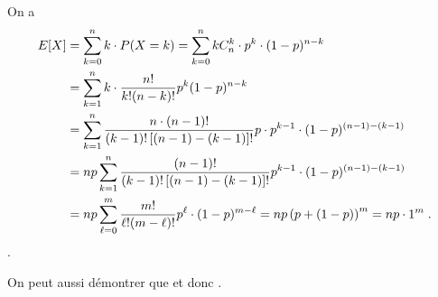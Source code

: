                   On a 
                  \begin{align*}
                        E[X] & = \sum_{k=0}^{n} k \cdot P(X=k)                                                
                               = \sum_{k=0}^{n} k C_{n}^{k} \cdot p^k \cdot (1-p)^{n-k}                        \\
                             & = \sum_{k=1}^{n} k \cdot \frac{n!}{k! (n-k)!} p^k (1-p)^{n-k}                  \\
                             & = \sum_{k=1}^{n} \frac{n \cdot (n-1)!}{(k-1)! \left[ (n-1) - (k-1) \right]!} 
                                       p \cdot p^{k-1} \cdot (1-p)^{(n-1) - (k-1)}                            \\
                             & = n p \sum_{k=1}^{n} \frac{(n-1)!}{(k-1)! \left[ (n-1) - (k-1) \right]!}
                                               p^{k-1} \cdot (1-p)^{(n-1) - (k-1)}                            \\
                             & = n p \sum_{\ell=0}^{m} \frac{m!}{\ell! (m-\ell)!} p^{\ell} \cdot (1-p)^{m-\ell}               
                               = n p \left(p+(1-p)\right)^{m}                                                 
                               = n p \cdot 1^{m}                                                              \;.
                  \end{align*}
                  .
                  
                  On peut aussi d\'emontrer que 
                   et donc .
                        















